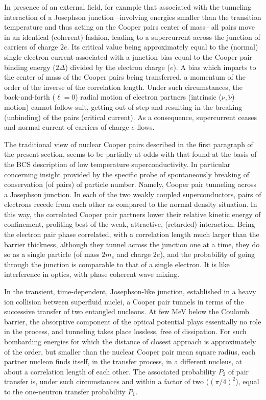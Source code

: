 In presence of an external field, for example that associated with the tunneling interaction of a Josephson junction --involving energies smaller than the transition temperature and thus acting on the Cooper pairs center of mass-- all pairs move  in an identical (coherent) fashion, leading to a supercurrent across the junction of carriers of charge $2e$. Its critical value  being approximately equal to the (normal) single-electron current associated with a junction bias equal to the Cooper pair binding energy ($2\Delta$) 
 divided by the electron charge ($e$). A bias which imparts 
 to the center of mass of the  Cooper pairs being transferred, a momentum of the order of the inverse of the correlation length. Under such circumstances,  the back-and-forth ($\ell=0$) radial motion of electron partners (intrinsic ($\nu,\tilde \nu$) motion) cannot follow suit, getting out of step and resulting in the breaking (unbinding) of the pairs (critical current). As a consequence, supercurrent ceases and  normal current of carriers of charge $e$ flows.

The traditional view of nuclear Cooper pairs described in the first paragraph of the present section, seems to be partially at odds with that found at the basis of the BCS description of low temperature superconductivity. In particular concerning insight provided by the specific probe of spontaneously breaking of conservation (of pairs) of particle number. Namely, Cooper pair tunneling across a Josephson junction.  In each of the two weakly coupled superconductors, pairs of electrons recede from each other  as compared to the normal density situation. In this way, the correlated Cooper pair partners  lower their relative kinetic energy of confinement, profiting best of the weak, attractive, (retarded) interaction. Being the electron pair phase correlated, with a correlation length much larger than the barrier thickness, although they tunnel across the junction one at a time, they do so as a single particle (of mass $2m_e$ and charge $2e$), and the probability of going through the junction is comparable to that of a single electron. It is like interference in optics, with phase coherent wave mixing.



In the transient, time-dependent, Josephson-like junction, established in a heavy ion collision between superfluid nuclei, a Cooper pair tunnels in terms of the successive transfer of two entangled nucleons. At few MeV below the Coulomb barrier, the absorptive component of the optical potential plays essentially no role in the process, and tunneling takes place lossless, free of dissipation. For such bombarding energies for which the distance of closest approach is approximately of the order, but smaller than the nuclear Cooper pair mean square radius, each partner nucleon  finds itself, in the transfer process, in a different nucleus, at about a  correlation length of each other. The associated probability $P_2$ of pair transfer is, under such circumstances and within a factor of two ($(\pi/4)^2$), equal to the one-neutron transfer probability $P_1$.


